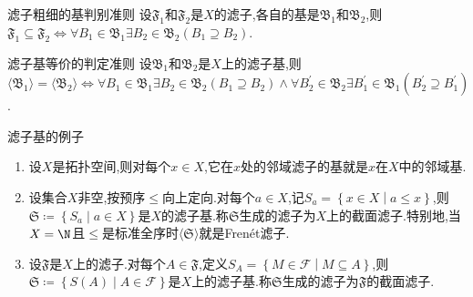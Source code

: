 \begin{proposition}{滤子粗细的基判别准则}{}
	设$\mathfrak{F}_{1}$和$\mathfrak{F}_{2}$是$X$的滤子,各自的基是$\mathfrak{B}_{1}$和$\mathfrak{B}_{2}$,则$\mathfrak{F}_{1}\subseteq\mathfrak{F}_{2}\iff\forall B_{1}\in\mathfrak{B}_{1}\exists B_{2}\in\mathfrak{B}_{2}\left(B_{1}\supseteq B_{2}\right)$.
\end{proposition}

\begin{corollary}{滤子基等价的判定准则}{}
	设$\mathfrak{B}_{1}$和$\mathfrak{B}_{2}$是$X$上的滤子基,则$\langle\mathfrak{B}_{1}\rangle=\langle\mathfrak{B}_{2}\rangle\iff\forall B_{1}\in\mathfrak{B}_{1}\exists B_{2}\in\mathfrak{B}_{2}\left(B_{1}\supseteq B_{2}\right)\wedge\forall B_{2}^{\prime}\in\mathfrak{B}_{2}\exists B_{1}^{\prime}\in\mathfrak{B}_{1}\left(B_{2}^{\prime}\supseteq B_{1}^{\prime}\right)$.
\end{corollary}

\begin{example}{滤子基的例子}{}
	\begin{enumerate}
		\item 设$X$是拓扑空间,则对每个$x\in X$,它在$x$处的邻域滤子的基就是$x$在$X$中的邻域基.
		\item 设集合$X$非空,按预序$\leq$向上定向.对每个$a\in X$,记$S_{a}=\left\{x\in X\middle|a\leq x\right\}$,则$\mathfrak{S}\coloneq\left\{S_{a}\middle|a\in X\right\}$是$X$的滤子基.称$\mathfrak{S}$生成的滤子为$X$上的截面滤子.特别地,当$X=\N$且$\leq$是标准全序时$\langle\mathfrak{S}\rangle$就是Fren\'{e}t滤子.
		\item 设$\mathfrak{F}$是$X$上的滤子.对每个$A\in\mathfrak{F}$,定义$S_{A}=\left\{M\in\mathcal{F}\middle|M\subseteq A\right\}$,则$\mathfrak{S}\coloneq\left\{S\left(A\right)\middle|A\in\mathcal{F}\right\}$是$X$上的滤子基.称$\mathfrak{S}$生成的滤子为$\mathfrak{F}$的截面滤子.
	\end{enumerate}
\end{example}
